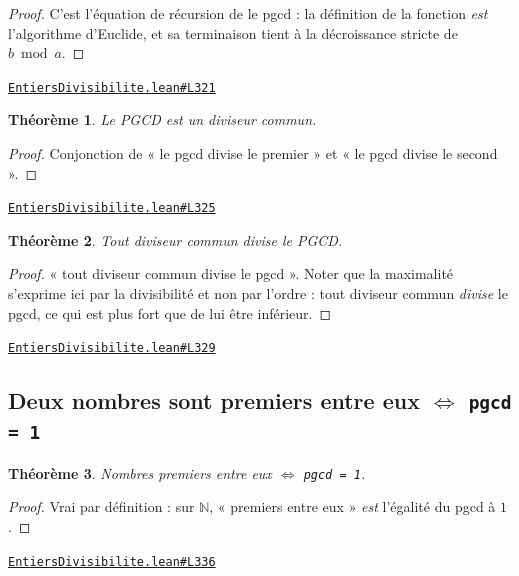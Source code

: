 \documentclass[11pt,a4paper]{article}
\theoremstyle{definition}
\theoremstyle{plain}
\newtheorem{theoreme}{Théorème}
\newcommand{\source}[2]{\par\smallskip\noindent\hfill{\footnotesize\href{#1}{\texttt{#2}}}\par\smallskip}
\begin{document}
\begin{proof}
C'est l'équation de récursion de le pgcd : la définition de la fonction
\emph{est} l'algorithme d'Euclide, et sa terminaison tient à la décroissance stricte de
$b \bmod a$.
\end{proof}
\source{https://github.com/Commutator-IO/learn-lean/blob/main/courses/01-college/01-nombres-et-calculs/EntiersDivisibilite.lean\#L321}{EntiersDivisibilite.lean\#L321}

\begin{theoreme}
Le PGCD est un diviseur commun.
\end{theoreme}

\begin{proof}
Conjonction de « le pgcd divise le premier » et « le pgcd divise le second ».
\end{proof}
\source{https://github.com/Commutator-IO/learn-lean/blob/main/courses/01-college/01-nombres-et-calculs/EntiersDivisibilite.lean\#L325}{EntiersDivisibilite.lean\#L325}

\begin{theoreme}
Tout diviseur commun divise le PGCD.
\end{theoreme}

\begin{proof}
« tout diviseur commun divise le pgcd ». Noter que la maximalité s'exprime ici par la divisibilité et non
par l'ordre : tout diviseur commun \emph{divise} le pgcd, ce qui est plus fort que de lui
être inférieur.
\end{proof}
\source{https://github.com/Commutator-IO/learn-lean/blob/main/courses/01-college/01-nombres-et-calculs/EntiersDivisibilite.lean\#L329}{EntiersDivisibilite.lean\#L329}

\subsection{Deux nombres sont premiers entre eux \(\iff\) \texttt{pgcd = 1}}

\begin{theoreme}
Nombres premiers entre eux \(\iff\) \texttt{pgcd = 1}.
\end{theoreme}

\begin{proof}
Vrai par définition : sur $\mathbb{N}$, « premiers entre eux » \emph{est} l'égalité du
pgcd à $1$.
\end{proof}
\source{https://github.com/Commutator-IO/learn-lean/blob/main/courses/01-college/01-nombres-et-calculs/EntiersDivisibilite.lean\#L336}{EntiersDivisibilite.lean\#L336}
\end{document}
